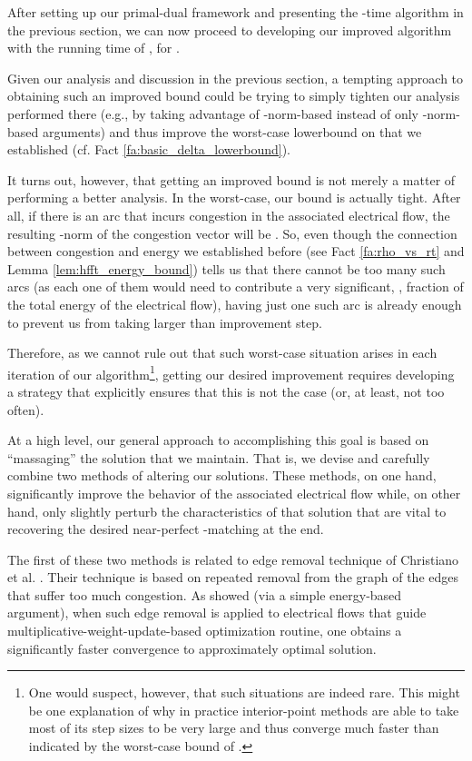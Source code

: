 \documentclass[11pt, letterpaper]{article}
\begin{document}
After setting up our primal-dual framework and presenting the -time algorithm in the previous section, we can now proceed to developing our improved algorithm with the running time of , for .

Given our analysis and discussion in the previous section, a tempting approach to obtaining such an improved bound could be trying to simply tighten our analysis performed there (e.g., by taking advantage of -norm-based instead of only -norm-based arguments) and thus improve the worst-case lowerbound on  that we established (cf. Fact \ref{fa:basic_delta_lowerbound}). 

It turns out, however, that getting an improved bound is not merely a matter of performing a better analysis. In the worst-case, our  bound is actually tight. After all, if there is an arc that incurs  congestion in the associated electrical flow, the resulting -norm of the congestion vector will be . So, even though the connection between congestion and energy we established before (see Fact \ref{fa:rho_vs_rt} and Lemma \ref{lem:hfft_energy_bound}) tells us that there cannot be too many such arcs (as each one of them would need to contribute a very significant, , fraction of the total energy of the electrical flow), having just one such arc is already enough to prevent us from taking larger than  improvement step. 

Therefore, as we cannot rule out that such worst-case situation arises in each iteration of our algorithm\footnote{One would suspect, however, that such situations are indeed rare. This might be one explanation of why in practice interior-point methods are able to take most of its step sizes to be very large and thus converge much faster than indicated by the worst-case bound of .}, getting our desired improvement requires developing a strategy that explicitly ensures that this is not the case (or, at least, not too often). 

At a high level, our general approach to accomplishing this goal is based on ``massaging'' the solution that we maintain. That is, we devise and carefully combine two methods of altering our solutions. These methods, on one hand, significantly improve the behavior of the associated electrical flow while, on other hand, only slightly perturb the characteristics of that solution that are vital to recovering the desired near-perfect -matching at the end.

The first of these two methods is related to edge removal technique of Christiano et al. \cite{ChristianoKMST11}. Their technique is based on repeated removal from the graph of the edges that suffer too much congestion. As \cite{ChristianoKMST11} showed (via a simple energy-based argument), when such edge removal is applied to electrical flows that guide multiplicative-weight-update-based optimization routine, one obtains a significantly faster convergence to approximately optimal solution.
\end{document}
